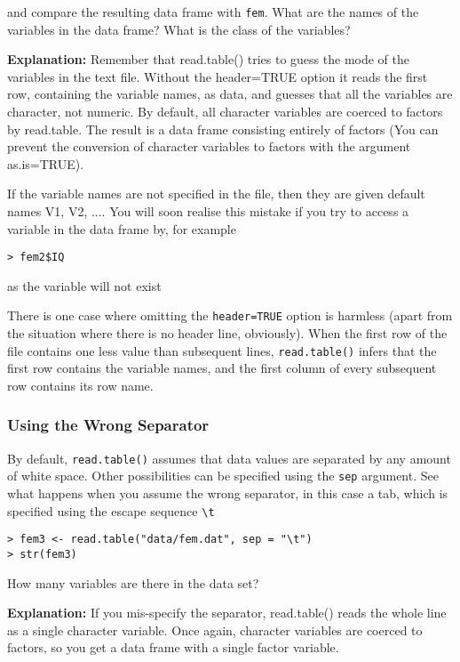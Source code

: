 \documentclass[12pt]{article}
\begin{document}
and compare the resulting data frame with \texttt{fem}. What are the names of the variables in the data
frame? What is the class of the variables?

\textbf{Explanation:} Remember that read.table() tries to guess the mode of the variables
in the text file. Without the header=TRUE option it reads the first row, containing the
variable names, as data, and guesses that all the variables are character, not numeric.
By default, all character variables are coerced to factors by read.table. The result is
a data frame consisting entirely of factors (You can prevent the conversion of
character variables to factors with the argument as.is=TRUE).

If the variable names are not specified in the file, then they are given default names V1, V2,
.... You will soon realise this mistake if you try to access a variable in the data frame by, for
example

\begin{verbatim}
> fem2$IQ
\end{verbatim}

as the variable will not exist

There is one case where omitting the \texttt{header=TRUE} option is harmless (apart from the situation where there is no header line, obviously). When the first row of the file contains one less value
than subsequent lines, \texttt{read.table()} infers that the first row contains the variable names, and the first column of every subsequent row contains its row name.

\subsubsection{Using the Wrong Separator}
By default, \texttt{read.table()} assumes that data values are separated by any amount of white space.
Other possibilities can be specified using the \texttt{sep} argument. See what happens when you assume the wrong separator, in this case a tab, which is specified using the escape sequence \verb+\t+

\begin{verbatim}
> fem3 <- read.table("data/fem.dat", sep = "\t")
> str(fem3)
\end{verbatim}

How many variables are there in the data set?

\textbf{Explanation:} If you mis-specify the separator, read.table() reads the whole line as
a single character variable. Once again, character variables are coerced to factors, so
you get a data frame with a single factor variable.
\end{document}
